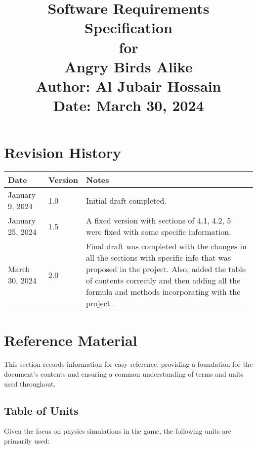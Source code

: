 \documentclass[12pt]{article}
\title{
    {\Huge Software Requirements Specification} \\
    {\Large for} \\
    {\Large Angry Birds Alike} \\
    \vspace{0.5em}
    {\Large Author: Al Jubair Hossain} \\
    \vspace{0.5em}
    {\large Date: March 30, 2024}
}
\date{}
\begin{document}
\maketitle

\newpage

\section*{Revision History}
\begin{longtable}{|p{2cm}|p{2cm}|p{10cm}|}
    \hline
    \textbf{Date} & \textbf{Version} & \textbf{Notes} \\
    \hline
    January 9, 2024 & 1.0 & Initial draft completed. \\\hline
    January 25, 2024 & 1.5 & A fixed version with sections of 4.1, 4.2, 5 were fixed with some specific information. \\\hline
    March 30, 2024 & 2.0 & Final draft was completed with the changes in all the sections with specific info that was proposed in the project. Also, added the table of contents correctly and then adding all the formula and methods incorporating with the project . \\
    \hline
\end{longtable}

\newpage

\tableofcontents

\newpage

\section{Reference Material}
This section records information for easy reference, providing a foundation for the document's contents and ensuring a common understanding of terms and units used throughout.

\subsection{Table of Units}
Given the focus on physics simulations in the game, the following units are primarily used:
\end{document}
